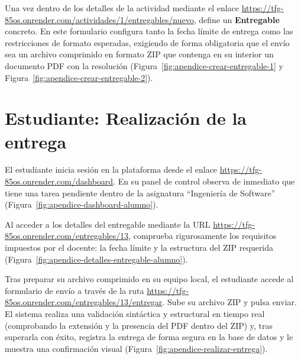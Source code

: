 Una vez dentro de los detalles de la actividad mediante el enlace \url{https://tfg-85os.onrender.com/actividades/1/entregables/nuevo}, define un \textbf{Entregable} concreto. En este formulario configura tanto la fecha l\'imite de entrega como las restricciones de formato esperadas, exigiendo de forma obligatoria que el env\'io sea un archivo comprimido en formato ZIP que contenga en su interior un documento PDF con la resoluci\'on (Figura~\ref{fig:apendice-crear-entregable-1} y Figura~\ref{fig:apendice-crear-entregable-2}).



\section{Estudiante: Realizaci\'on de la entrega}

El estudiante inicia sesi\'on en la plataforma desde el enlace \url{https://tfg-85os.onrender.com/dashboard}. En su panel de control observa de inmediato que tiene una tarea pendiente dentro de la asignatura ``Ingenier\'ia de Software'' (Figura~\ref{fig:apendice-dashboard-alumno}).


Al acceder a los detalles del entregable mediante la URL \url{https://tfg-85os.onrender.com/entregables/13}, comprueba rigurosamente los requisitos impuestos por el docente: la fecha l\'imite y la estructura del ZIP requerida (Figura~\ref{fig:apendice-detalles-entregable-alumno}).


Tras preparar su archivo comprimido en su equipo local, el estudiante accede al formulario de env\'io a trav\'es de la ruta \url{https://tfg-85os.onrender.com/entregables/13/entregar}. Sube su archivo ZIP y pulsa enviar. El sistema realiza una validaci\'on sint\'actica y estructural en tiempo real (comprobando la extensi\'on y la presencia del PDF dentro del ZIP) y, tras superarla con \'exito, registra la entrega de forma segura en la base de datos y le muestra una confirmaci\'on visual (Figura~\ref{fig:apendice-realizar-entrega}).

